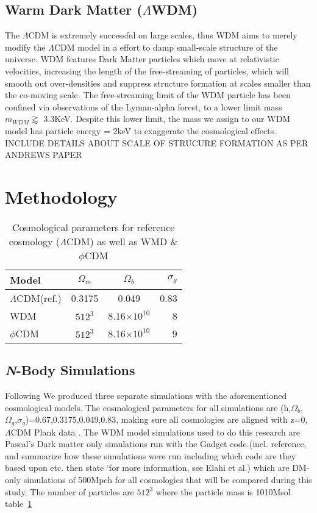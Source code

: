 \documentclass[a4paper,fleqn,usenatbib]{mnras}
\def \qcdm{$\phi$CDM}
\begin{document}
\subsection{Warm Dark Matter  ($\Lambda$WDM)} 
The $\Lambda$CDM is extremely successful on large scales, thus WDM aims to merely modify the $\Lambda$CDM model in a effort to damp small-scale structure of the universe. WDM features Dark Matter particles which move at relativistic velocities, increasing the length of the free-streaming of particles, which will smooth out over-densities and suppress structure formation at scales smaller than the co-moving scale\citep{Bode_01}.
The free-streaming limit of the WDM particle has been confined via observations of the Lyman-alpha forest, to a lower limit mass $m_{WDM}\gtrapprox$ 3.3KeV. \citep{Viel_13} Despite this lower limit, the mass we assign to our WDM model has particle energy = 2keV to exaggerate the cosmological effects. INCLUDE DETAILS ABOUT SCALE OF STRUCURE FORMATION AS PER ANDREWS PAPER  

\section{Methodology}\label{SiriusBlack}\label{method}

\begin{table}
	\centering
	\caption{Cosmological parameters for reference cosmology ($\Lambda$CDM) as well as WMD \& \qcdm}
	\label{tab:1}
	\begin{tabular}{lccr} %
		\hline
		Model & $\Omega_{m}$ & $\Omega_{b}$ & $\sigma_{g}$  \\
		\hline
		$\Lambda$CDM(ref.) & 0.3175 & 0.049 & 0.83\\
		WDM & $512^{3}$ & 8.16$\times$$10^{10}$ & 8 \\
		\qcdm & $512^{3}$ & 8.16$\times$$10^{10}$ & 9 \\
		\hline
	\end{tabular}
\end{table}

\subsection{\textit{N}-Body Simulations}
Following \citep{Elahi_15} We produced three separate simulations with the aforementioned cosmological models. The cosmological parameters for all simulations are (h,$\Omega_{b}$,$\Omega_{g}$,$\sigma_{g}$)=0.67,0.3175,0.049,0.83, making sure all cosmologies are aligned with z=0, $\Lambda$CDM Plank data \citep{Plank_14b,Plank_16}. The WDM model  simulations used to do this research are Pascal’s Dark matter only simulations run with the Gadget code.(incl. reference, and summarize how these simulations were run including which code are they based upon etc. then state ‘for more information, see Elahi et al.) which are DM-only simulations of 500Mpch for all cosmologies that will be compared during this study. The number of particles are $512^{3}$ where the particle mass is 1010Msol table~\ref{tab:1}
\end{document}
